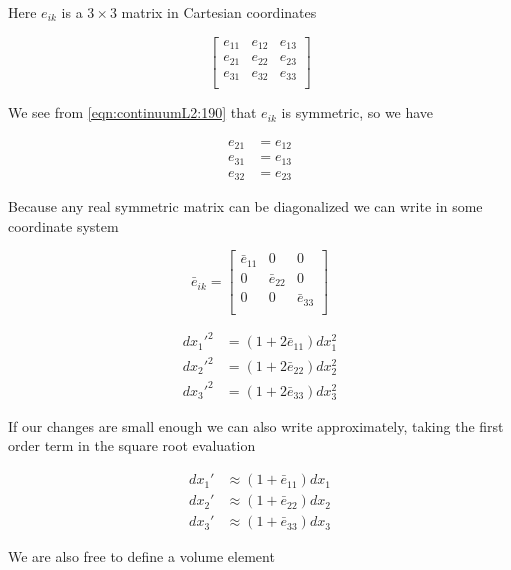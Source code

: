 Here $e_{ik}$ is a $3 \times 3$ matrix in Cartesian coordinates

\begin{equation}\label{eqn:continuumL2:210}
\begin{bmatrix}
e_{11} & e_{12} & e_{13} \\
e_{21} & e_{22} & e_{23} \\
e_{31} & e_{32} & e_{33} \\
\end{bmatrix}
\end{equation}

We see from \ref{eqn:continuumL2:190} that $e_{ik}$ is symmetric, so we have

\begin{align}\label{eqn:continuumL2:230}
e_{21} &= e_{12} \\
e_{31} &= e_{13} \\
e_{32} &= e_{23}
\end{align}

Because any real symmetric matrix can be diagonalized we can write in some coordinate system

\begin{equation}\label{eqn:continuumL2:250}
\bar{e}_{ik} = 
\begin{bmatrix}
\bar{e}_{11} & 0 & 0 \\
0 & \bar{e}_{22} & 0 \\
0 & 0 & \bar{e}_{33} \\
\end{bmatrix}
\end{equation}

\begin{align}\label{eqn:continuumL2:270}
{dx_1'}^2 &= (1 + 2 \bar{e}_{11}) dx_1^2 \\
{dx_2'}^2 &= (1 + 2 \bar{e}_{22}) dx_2^2 \\
{dx_3'}^2 &= (1 + 2 \bar{e}_{33}) dx_3^2
\end{align}

If our changes are small enough we can also write approximately, taking the first order term in the square root evaluation

\begin{align}\label{eqn:continuumL2:290}
dx_1' &\approx (1 + \bar{e}_{11}) dx_1 \\
dx_2' &\approx (1 + \bar{e}_{22}) dx_2 \\
dx_3' &\approx (1 + \bar{e}_{33}) dx_3
\end{align}

We are also free to define a volume element

